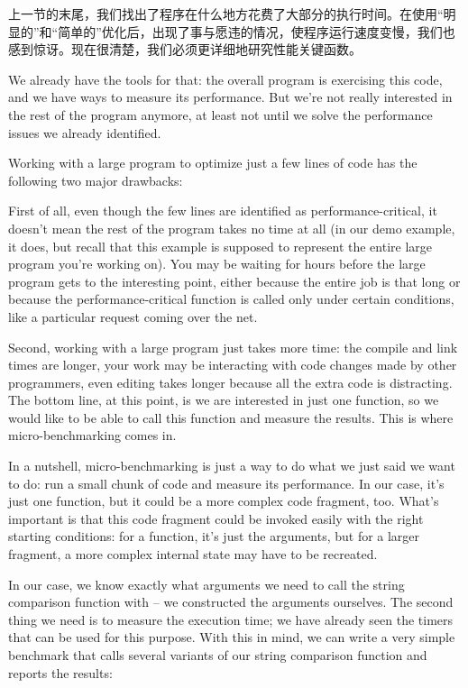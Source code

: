 
上一节的末尾，我们找出了程序在什么地方花费了大部分的执行时间。在使用“明显的”和“简单的”优化后，出现了事与愿违的情况，使程序运行速度变慢，我们也感到惊讶。现在很清楚，我们必须更详细地研究性能关键函数。

We already have the tools for that: the overall program is exercising this code, and we have ways to measure its performance. But we're not really interested in the rest of the program anymore, at least not until we solve the performance issues we already identified. 

Working with a large program to optimize just a few lines of code has the following two major drawbacks:

First of all, even though the few lines are identified as performance-critical, it doesn't mean the rest of the program takes no time at all (in our demo example, it does, but recall that this example is supposed to represent the entire large program you're working on). You may be waiting for hours before the large program gets to the interesting point, either because the entire job is that long or because the performance-critical function is called only under certain conditions, like a particular request coming over the net.

Second, working with a large program just takes more time: the compile and link times are longer, your work may be interacting with code changes made by other programmers, even editing takes longer because all the extra code is distracting. The bottom line, at this point, is we are interested in just one function, so we would like to be able to call this function and measure the results. This is where micro-benchmarking comes in.


In a nutshell, micro-benchmarking is just a way to do what we just said we want to do: run a small chunk of code and measure its performance. In our case, it's just one function, but it could be a more complex code fragment, too. What's important is that this code fragment could be invoked easily with the right starting conditions: for a function, it's just the arguments, but for a larger fragment, a more complex internal state may have to be recreated.

In our case, we know exactly what arguments we need to call the string comparison function with – we constructed the arguments ourselves. The second thing we need is to measure the execution time; we have already seen the timers that can be used for this purpose. With this in mind, we can write a very simple benchmark that calls several variants of our string comparison function and reports the results:

